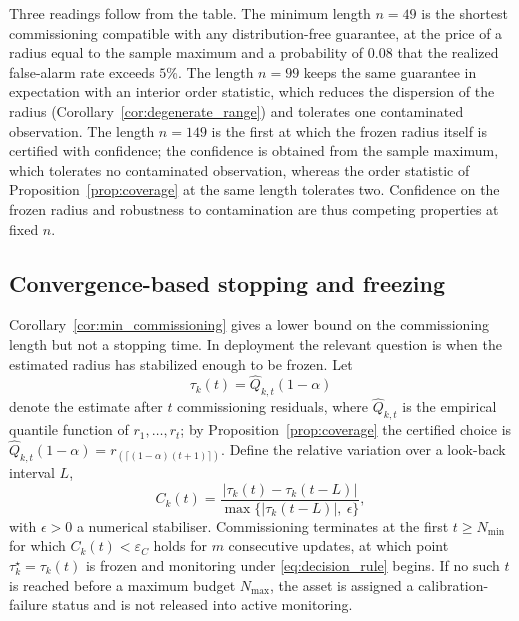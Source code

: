 \documentclass[a4paper]{cas-sc}
\newenvironment{reviewadded}{\par\color{blue}}{\par}
\newcommand{\residual}{\ensuremath{r}}
\begin{document}
\begin{reviewadded}
Three readings follow from the table. The minimum length \(n=49\) is the
shortest commissioning compatible with any distribution-free guarantee, at
the price of a radius equal to the sample maximum and a probability of
\(0.08\) that the realized false-alarm rate exceeds \(5\%\). The length
\(n=99\) keeps the same guarantee in expectation with an interior order
statistic, which reduces the dispersion of the radius
(Corollary~\ref{cor:degenerate_range}) and tolerates one contaminated
observation. The length \(n=149\) is the first at which the frozen radius
itself is certified with confidence; the confidence is obtained from the
sample maximum, which tolerates no contaminated observation, whereas the
order statistic of Proposition~\ref{prop:coverage} at the same length
tolerates two. Confidence on the frozen radius and robustness to
contamination are thus competing properties at fixed \(n\).
\end{reviewadded}

\subsection{Convergence-based stopping and freezing}
\label{subsec:stopping}

Corollary~\ref{cor:min_commissioning} gives a lower bound on the
commissioning length but not a stopping time. In deployment the relevant
question is when the estimated radius has stabilized enough to be frozen.
Let
\begin{equation}
\tau_k(t) = \widehat{Q}_{k,t}(1-\alpha)
\label{eq:tau_online}
\end{equation}
denote the estimate after \(t\) commissioning residuals, where
\(\widehat{Q}_{k,t}\) is the empirical quantile function of
\(\residual_1,\ldots,\residual_t\); by
Proposition~\ref{prop:coverage} the certified choice is
\(\widehat{Q}_{k,t}(1-\alpha)=\residual_{(\lceil(1-\alpha)(t+1)\rceil)}\).
Define the relative variation over a look-back interval \(L\),
\begin{equation}
C_k(t)
=
\frac{\bigl|\tau_k(t)-\tau_k(t-L)\bigr|}
     {\max\bigl\{\bigl|\tau_k(t-L)\bigr|,\ \epsilon\bigr\}},
\label{eq:convergence}
\end{equation}
with \(\epsilon>0\) a numerical stabiliser. Commissioning terminates at the
first \(t\ge N_{\min}\) for which \(C_k(t)<\varepsilon_C\) holds for \(m\)
consecutive updates, at which point \(\tau_k^\star = \tau_k(t)\) is frozen
and monitoring under \eqref{eq:decision_rule} begins. If no such \(t\) is
reached before a maximum budget \(N_{\max}\), the asset is assigned a
calibration-failure status and is not released into active monitoring.
\end{document}

